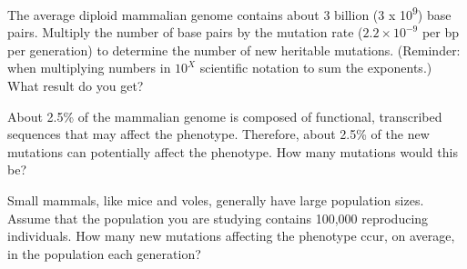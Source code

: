 \documentclass[11pt, addpoints, hidelinks]{exam}
\begin{document}
\begin{questions}

\question
\label{itm:kumar} The average diploid mammalian genome contains about 3
billion (3 x 10\textsuperscript{9}) base pairs. Multiply the number of
base pairs by the mutation rate ($2.2 \times 10^{-9}$ per bp per
generation) to determine the number of new heritable mutations.
(Reminder: when multiplying numbers in $10^X$ scientific
notation to sum the exponents.) What result do you get?%

\ifprintanswers{}
\else
\fi


\question
About 2.5\% of the mammalian genome is composed of
functional, transcribed sequences that may affect the phenotype.
Therefore, about 2.5\% of the new mutations can potentially affect the
phenotype. How many mutations would this be?

\ifprintanswers\vspace*{\baselineskip}{\bfseries%
	$6.6 \times 0.025 = 0.165$ mutations may affect the phenotype.}
\else
\fi


\question 
Small mammals, like mice and voles, generally have large
population sizes. Assume that the population you are studying contains
100,000 reproducing individuals. How many new mutations affecting the phenotype ccur, on
average, in the population each generation?

\ifprintanswers\vspace*{\baselineskip}{\bfseries%
	$100,000 \times 0.165 = 16,500$ new mutations per generation in the population.}
\else
\fi


\end{questions}
\end{document}
